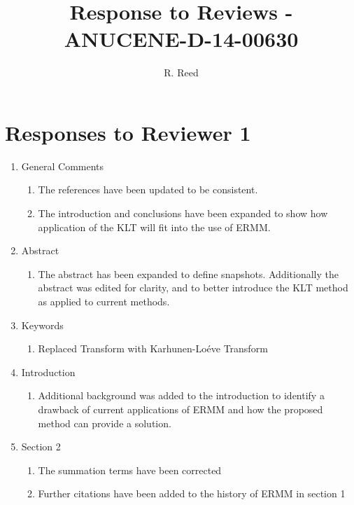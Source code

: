 \documentclass[a4paper,10pt]{article}
\title{Response to Reviews - ANUCENE-D-14-00630}
\author{R. Reed}
\begin{document}
\maketitle


\section*{Responses to Reviewer 1}

\begin{enumerate}
    \item General Comments
    \begin{enumerate}
        \item The references have been updated to be consistent.
        
        \item The introduction and conclusions have been expanded to show how 
        application of the KLT will fit into the use of ERMM. 
    \end{enumerate}
    
    \item Abstract
    \begin{enumerate}
        \item The abstract has been expanded to define snapshots.  Additionally 
        the abstract was edited for clarity, and to better introduce the KLT 
        method as applied to current methods.
    \end{enumerate}
    
    \item Keywords
    \begin{enumerate}
        \item Replaced Transform with Karhunen-Lo\'{e}ve Transform
    \end{enumerate}
    
    \item Introduction
    \begin{enumerate}
        \item Additional background was added to the introduction to identify a 
        drawback of current applications of ERMM and how the proposed method 
        can provide a solution.
    \end{enumerate}
    
    \item Section 2
    \begin{enumerate}
        \item  The summation terms have been corrected
        \item  Further citations have been added to the history of ERMM in 
        section 1
    \end{enumerate}
    

\end{enumerate}
\end{document}
